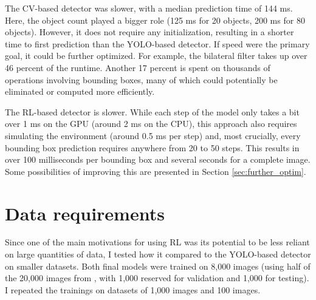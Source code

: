 \documentclass[
  digital,     %
  oneside,     %
  nosansbold,  %
  nocolorbold, %
  lof,         %
  lot,         %
]{fithesis4}
\begin{document}
The CV-based detector was slower, with a median prediction time of 144 ms. Here, the object count played a bigger role (125 ms for 20 objects, 200 ms for 80 objects). However, it does not require any initialization, resulting in a shorter time to first prediction than the YOLO-based detector. If speed were the primary goal, it could be further optimized. For example, the bilateral filter takes up over 46 percent of the runtime. Another 17 percent is spent on thousands of operations involving bounding boxes, many of which could potentially be eliminated or computed more efficiently.

The RL-based detector is slower. While each step of the model only takes a bit over 1 ms on the GPU (around 2 ms on the CPU), this approach also requires simulating the environment (around 0.5 ms per step) and, most crucially, every bounding box prediction requires anywhere from 20 to 50 steps. This results in over 100 milliseconds per bounding box and several seconds for a complete image. Some possibilities of improving this are presented in Section \ref{sec:further_optim}.


\section{Data requirements}
\label{sec:data_req}

Since one of the main motivations for using RL was its potential to be less reliant on large quantities of data, I tested how it compared to the YOLO-based detector on smaller datasets. Both final models were trained on 8,000 images (using half of the 20,000 images from \cite{aydos2020}, with 1,000 reserved for validation and 1,000 for testing). I repeated the trainings on datasets of 1,000 images and 100 images.
\end{document}
